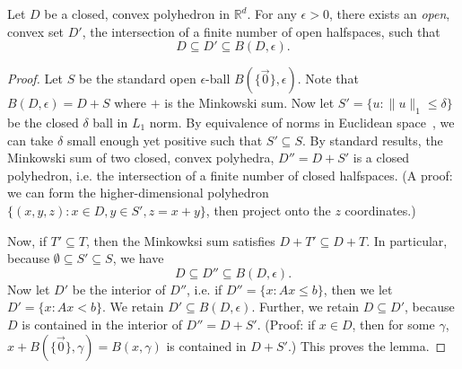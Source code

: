 \documentclass[twoside,11pt]{article}
\newcommand{\Comments}{1}
\newcommand{\mynote}[2]{\ifnum\Comments=1\textcolor{#1}{#2}\fi}
\newcommand{\bo}[1]{\mynote{blue}{[Bo: #1]}}
\newcommand{\reals}{\mathbb{R}}
\begin{document}
\begin{lemma} \label{lem:enclose-halfspaces}
  Let $D$ be a closed, convex polyhedron in $\reals^d$.
  For any $\epsilon > 0$, there exists an \emph{open}, convex set $D'$, the intersection of a finite number of open halfspaces, such that
    \[ D \subseteq D' \subseteq B(D,\epsilon) . \]
\end{lemma}
\begin{proof}
  Let $S$ be the standard open $\epsilon$-ball $B(\{\vec{0}\},\epsilon)$.
  Note that $B(D,\epsilon) = D + S$ where $+$ is the Minkowski sum.
  Now let $S' = \{u : \|u\|_1 \leq \delta\}$ be the closed $\delta$ ball in $L_1$ norm.
  By equivalence of norms in Euclidean space~\cite[Appendix A.1.4]{boyd2004convex}, we can take $\delta$ small enough yet positive such that $S' \subseteq S$.
  By standard results, the Minkowski sum of two closed, convex polyhedra, $D'' = D + S'$ is a closed polyhedron, i.e. the intersection of a finite number of closed halfspaces. (A proof: we can form the higher-dimensional polyhedron $\{(x,y,z) : x \in D, y \in S', z = x+y\}$, then project onto the $z$ coordinates.)

  Now, if $T' \subseteq T$, then the Minkowksi sum satisfies $D + T' \subseteq D + T$.
  In particular, because $\emptyset \subseteq S' \subseteq S$, we have
    \[ D \subseteq D'' \subseteq B(D,\epsilon) . \]
  Now let $D'$ be the interior of $D''$, i.e. if $D'' = \{x : Ax \leq b\}$, then we let $D' = \{x: Ax < b\}$.
  We retain $D' \subseteq B(D,\epsilon)$.
  Further, we retain $D \subseteq D'$, because $D$ is contained in the interior of $D'' = D + S'$.
  (Proof: if $x \in D$, then for some $\gamma$, $x + B(\{\vec{0}\},\gamma) = B(x,\gamma)$ is contained in $D + S'$.)
  This proves the lemma.
\end{proof}
\end{document}
